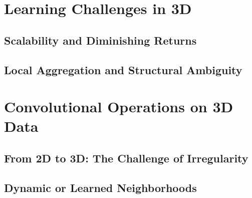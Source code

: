 \section{Learning Challenges in 3D}

\subsection{Scalability and Diminishing Returns}

\subsection{Local Aggregation and Structural Ambiguity}



\section{Convolutional Operations on 3D Data}

\subsection{From 2D to 3D{:} The Challenge of Irregularity}

\subsection{Dynamic or Learned Neighborhoods}





